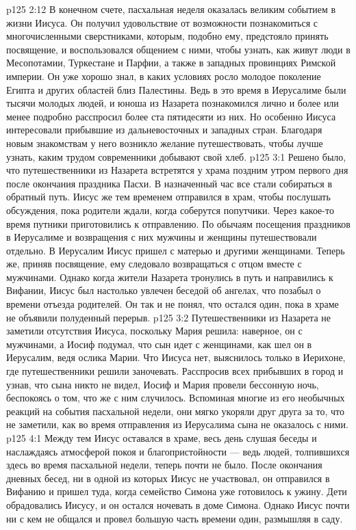 \vs p125 2:12 В конечном счете, пасхальная неделя оказалась великим событием в жизни Иисуса. Он получил удовольствие от возможности познакомиться с многочисленными сверстниками, которым, подобно ему, предстояло принять посвящение, и воспользовался общением с ними, чтобы узнать, как живут люди в Месопотамии, Туркестане и Парфии, а также в западных провинциях Римской империи. Он уже хорошо знал, в каких условиях росло молодое поколение Египта и других областей близ Палестины. Ведь в это время в Иерусалиме были тысячи молодых людей, и юноша из Назарета познакомился лично и более или менее подробно расспросил более ста пятидесяти из них. Но особенно Иисуса интересовали прибывшие из дальневосточных и западных стран. Благодаря новым знакомствам у него возникло желание путешествовать, чтобы лучше узнать, каким трудом современники добывают свой хлеб.
\vs p125 3:1 Решено было, что путешественники из Назарета встретятся у храма поздним утром первого дня после окончания праздника Пасхи. В назначенный час все стали собираться в обратный путь. Иисус же тем временем отправился в храм, чтобы послушать обсуждения, пока родители ждали, когда соберутся попутчики. Через какое\hyp{}то время путники приготовились к отправлению. По обычаям посещения праздников в Иерусалиме и возвращения с них мужчины и женщины путешествовали отдельно. В Иерусалим Иисус пришел с матерью и другими женщинами. Теперь же, приняв посвящение, ему следовало возвращаться с отцом вместе с мужчинами. Однако когда жители Назарета тронулись в путь и направились к Вифании, Иисус был настолько увлечен беседой об ангелах, что позабыл о времени отъезда родителей. Он так и не понял, что остался один, пока в храме не объявили полуденный перерыв.
\vs p125 3:2 Путешественники из Назарета не заметили отсутствия Иисуса, поскольку Мария решила: наверное, он с мужчинами, а Иосиф подумал, что сын идет с женщинами, как шел он в Иерусалим, ведя ослика Марии. Что Иисуса нет, выяснилось только в Иерихоне, где путешественники решили заночевать. Расспросив всех прибывших в город и узнав, что сына никто не видел, Иосиф и Мария провели бессонную ночь, беспокоясь о том, что же с ним случилось. Вспоминая многие из его необычных реакций на события пасхальной недели, они мягко укоряли друг друга за то, что не заметили, как во время отправления из Иерусалима сына не оказалось с ними.
\vs p125 4:1 Между тем Иисус оставался в храме, весь день слушая беседы и наслаждаясь атмосферой покоя и благопристойности --- ведь людей, толпившихся здесь во время пасхальной недели, теперь почти не было. После окончания дневных бесед, ни в одной из которых Иисус не участвовал, он отправился в Вифанию и пришел туда, когда семейство Симона уже готовилось к ужину. Дети обрадовались Иисусу, и он остался ночевать в доме Симона. Однако Иисус почти ни с кем не общался и провел большую часть времени один, размышляя в саду.
